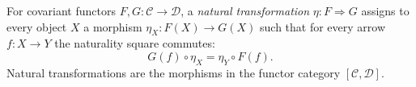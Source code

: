 
For covariant functors $F,G:\mathcal C\to\mathcal D$, a \emph{natural transformation} $\eta:F\Rightarrow G$ assigns to every object $X$ a morphism $\eta_X:F(X)\to G(X)$ such that for every arrow $f:X\to Y$ the naturality square commutes:
\[
G(f)\circ\eta_X=\eta_Y\circ F(f).
\]
Natural transformations are the morphisms in the functor category $[\mathcal C,\mathcal D]$.
